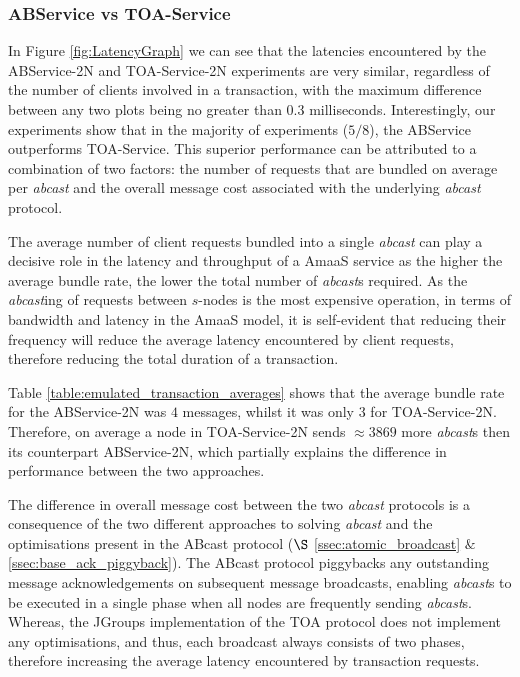     \subsubsection*{ABService vs TOA-Service}
    In Figure \ref{fig:LatencyGraph} we can see that the latencies encountered by the ABService-2N and TOA-Service-2N experiments are very similar, regardless of the number of clients involved in a transaction, with the maximum difference between any two plots being no greater than $0.3$ milliseconds.  Interestingly, our experiments show that in the majority of experiments ($5/8$), the ABService outperforms TOA-Service.  This superior performance can be attributed to a combination of two factors: the number of requests that are bundled on average per \emph{abcast} and the overall message cost associated with the underlying \emph{abcast} protocol.  
    
    The average number of client requests bundled into a single \emph{abcast} can play a decisive role in the latency and throughput of a \textsf{AmaaS} service as the higher the average bundle rate, the lower the total number of \emph{abcast}s required.  As the \emph{abcast}ing of requests between $s$-nodes is the most expensive operation, in terms of bandwidth and latency in the \textsf{AmaaS} model, it is self-evident that reducing their frequency will reduce the average latency encountered by client requests, therefore reducing the total duration of a transaction.  
    
    Table \ref{table:emulated_transaction_averages} shows that the average bundle rate for the ABService-2N was $4$ messages, whilst it was only $3$ for TOA-Service-2N.  Therefore, on average a node in TOA-Service-2N sends $\approx 3869$ more \emph{abcast}s then its counterpart ABService-2N, which partially explains the difference in performance between the two approaches.  
    
    The difference in overall message cost between the two \emph{abcast} protocols is a consequence of the two different approaches to solving \emph{abcast} and the optimisations present in the \textsf{ABcast} protocol ($\S$  \ref{ssec:atomic_broadcast} $\&$ \ref{ssec:base_ack_piggyback}).  The \textsf{ABcast} protocol piggybacks any outstanding message acknowledgements on subsequent message broadcasts, enabling \emph{abcast}s to be executed in a single phase when all nodes are frequently sending \emph{abcast}s.  Whereas, the JGroups implementation of the TOA protocol does not implement any optimisations, and thus, each broadcast always consists of two phases, therefore increasing the average latency encountered by transaction requests.  
	
